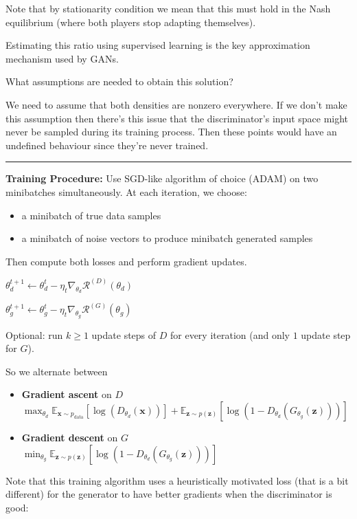 \documentclass[a2paper,8pt]{extarticle}
\newcommand{\cR}{\mathcal{R}}
\newcommand{\Exp}[2][]{{\mathbb{E}_{#1}}\left[ #2
\right]}
\renewcommand{\vec}[1]{\mathbf{#1}}
\newcommand{\vx}{\vec{x}}
\newcommand{\vz}{\vec{z}}
\newcommand{\sep}{\vspace{0pt}\noindent\hrule\vspace{0pt}}
\newcommand{\ssep}{\hdashrule[1.1ex]{\linewidth}{0.1pt}{0.3mm}\vspace{-6pt}}
\newcommand{\sep}{\vspace{5pt}\noindent\hrule\vspace{5pt}}
\newcommand{\ssep}{\hdashrule[1.1ex]{\linewidth}{0.1pt}{0.3mm}\vspace{-3pt}}
\begin{document}
\begin{landscape}
\begin{multicols*}{7}
Note that by stationarity condition we mean that this must hold in the
Nash equilibrium (where both players stop adapting themselves).

Estimating this ratio using supervised learning is the key approximation
mechanism used by GANs.



What assumptions are needed to obtain this solution?

We need to assume that both densities are nonzero everywhere. If we don't make
this assumption then there's this issue that the discriminator's input space
might never be sampled during its training process. Then these points would have
an undefined behaviour since they're never trained.

\sep

\textbf{Training Procedure:} Use SGD-like algorithm of choice (ADAM) on two
minibatches simultaneously. At each iteration, we choose:
\begin{itemize}
  \item a minibatch of true data samples
  \item a minibatch of noise vectors to produce minibatch generated samples
\end{itemize}
Then compute both losses and perform gradient updates.

$\theta_d^{t+1}\gets\theta_d^t-\eta_t\nabla_{\theta_d}\cR^{(D)}(\theta_d)$

$\theta_g^{t+1}\gets\theta_g^t-\eta_t\nabla_{\theta_g}\cR^{(G)}(\theta_g)$

Optional: run $k\geq 1$ update steps of $D$ for every iteration (and only
$1$ update step for $G$).

So we alternate between
\begin{itemize}
  \item \textbf{Gradient ascent} on $D$\\
  $
\max_{\theta_d}
\Exp[\vx\sim p_{\text{data}}]{\log(D_{\theta_d}(\vx))}
+
\Exp[\vz\sim p(\vz)]{\log(1-D_{\theta_d}(G_{\theta_g}(\vz)))}
  $
  \item \textbf{Gradient descent} on $G$\\
  $
\min_{\theta_g}
\Exp[\vz\sim p(\vz)]{\log(1-D_{\theta_d}(G_{\theta_g}(\vz)))}
  $
\end{itemize}

\ssep

Note that this training algorithm uses a heuristically motivated loss (that is
a bit different) for the generator to have better gradients when the
discriminator is good:


\end{multicols*}
\end{landscape}
\end{document}
